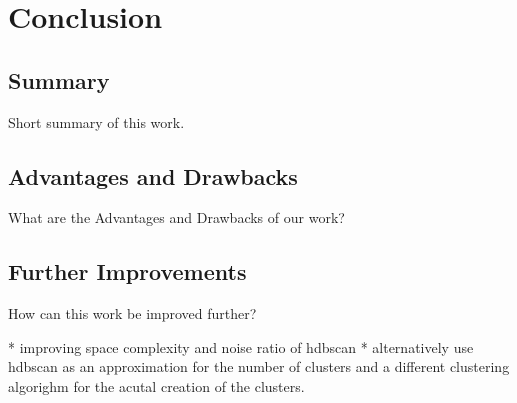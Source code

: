 \section{Conclusion}

\subsection{Summary}

Short summary of this work.

\subsection{Advantages and Drawbacks}

What are the Advantages and Drawbacks of our work?

\subsection{Further Improvements}

How can this work be improved further?

* improving space complexity and noise ratio of hdbscan
* alternatively use hdbscan as an approximation for the number of clusters and a different clustering algorighm for the acutal creation of the clusters.